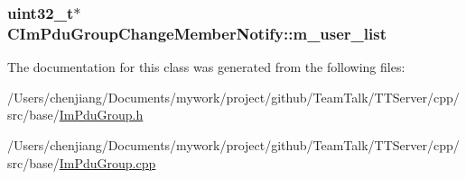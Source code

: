 \subsubsection[{m\+\_\+user\+\_\+list}]{\setlength{\rightskip}{0pt plus 5cm}uint32\+\_\+t$\ast$ C\+Im\+Pdu\+Group\+Change\+Member\+Notify\+::m\+\_\+user\+\_\+list\hspace{0.3cm}{\ttfamily [private]}}\label{class_c_im_pdu_group_change_member_notify_a889f9fe3feeb8c917b3fc0aa8c4da49c}


The documentation for this class was generated from the following files\+:\begin{DoxyCompactItemize}
\item 
/\+Users/chenjiang/\+Documents/mywork/project/github/\+Team\+Talk/\+T\+T\+Server/cpp/src/base/\hyperlink{_im_pdu_group_8h}{Im\+Pdu\+Group.\+h}\item 
/\+Users/chenjiang/\+Documents/mywork/project/github/\+Team\+Talk/\+T\+T\+Server/cpp/src/base/\hyperlink{_im_pdu_group_8cpp}{Im\+Pdu\+Group.\+cpp}\end{DoxyCompactItemize}
